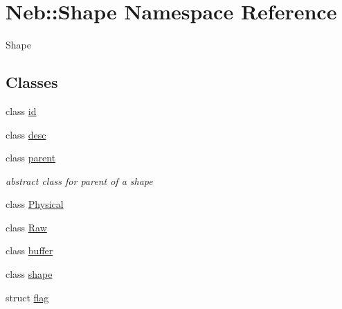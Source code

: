 \hypertarget{namespaceNeb_1_1Shape}{\section{\-Neb\-:\-:\-Shape \-Namespace \-Reference}
\label{namespaceNeb_1_1Shape}
}


\-Shape  


\subsection*{\-Classes}
\begin{DoxyCompactItemize}
\item 
class \hyperlink{classNeb_1_1Shape_1_1id}{id}
\item 
class \hyperlink{classNeb_1_1Shape_1_1desc}{desc}
\item 
class \hyperlink{classNeb_1_1Shape_1_1parent}{parent}
\begin{DoxyCompactList}\small\item\em abstract class for parent of a shape \end{DoxyCompactList}\item 
class \hyperlink{classNeb_1_1Shape_1_1Physical}{\-Physical}
\item 
class \hyperlink{classNeb_1_1Shape_1_1Raw}{\-Raw}
\item 
class \hyperlink{classNeb_1_1Shape_1_1buffer}{buffer}
\item 
class \hyperlink{classNeb_1_1Shape_1_1shape}{shape}
\item 
struct \hyperlink{structNeb_1_1Shape_1_1flag}{flag}
\end{DoxyCompactItemize}
